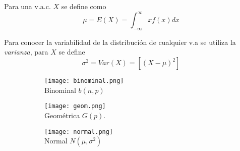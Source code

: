 Para una v.a.c. $X$ se define como
\begin{equation}
\mu=E(X)=\int_{-\infty}^{\infty}xf(x)dx
\end{equation}

Para conocer la variabilidad de la distribución de cualquier v.a se utiliza la \emph{varianza}, para $X$ se define
\begin{equation}
\sigma^2=Var(X)=[{(X-\mu)}^2]
\end{equation}

\begin{figure}[H]\centering\caption[Distribuciones]{Diversas de distribuciones pueden modelar v.a.s, a continuación se muestran las mas importantes de acuerdo a \citeauthor{bala20} (\citeyear{bala20}).}\label{FIG:DISTS}
\begin{subfigure}[t]{.3\textwidth}\texttt{[image: binominal.png]}\centering\\Binominal $b(n,p)$
\end{subfigure}\quad
\begin{subfigure}[t]{.3\textwidth}\texttt{[image: geom.png]}\centering\\Geométrica $G(p)$.
\end{subfigure}\quad
\begin{subfigure}[t]{.3\textwidth}\texttt{[image: normal.png]}\centering\\Normal $N(\mu,\sigma^2)$
\end{subfigure}
\end{figure}

